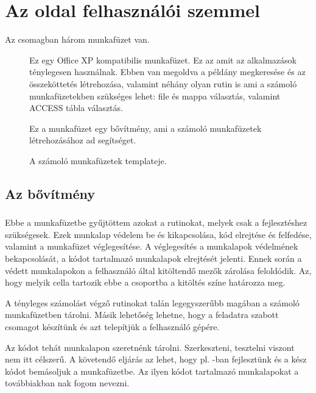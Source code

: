 \chapter{Az  oldal felhasználói szemmel}
\label{chap:3}

Az   csomagban három  munkafüzet van.
\begin{description}
\item[{}] Ez egy Office XP kompatibilis munkafüzet. Ez az
  amit az alkalmazások ténylegesen használnak. Ebben van megoldva a
   példány megkeresése és az összeköttetés létrehozása,
  valamint néhány olyan rutin is ami a számoló munkafüzetekben
  szükséges lehet: file és mappa választás, valamint ACCESS tábla választás.
\item[] Ez a munkafüzet egy bővítmény, ami a számoló
  munkafüzetek létrehozásához ad segítséget.
\item[] A számoló munkafüzetek templateje.
\end{description}

\section{Az  bővítmény}
\label{sec:3.1}

\subsection{}
Ebbe a munkafüzetbe gyűjtöttem azokat a rutinokat, melyek csak a
fejlesztéshez szükségesek. Ezek munkalap védelem be és kikapcsolása, 
kód elrejtése és felfedése, valamint a munkafüzet véglegesítése. A
véglegesítés a munkalapok védelmének bekapcsolását, a kódot tartalmazó
munkalapok elrejtését jelenti. Ennek során a védett munkalapokon a
felhasználó által kitöltendő mezők zárolása feloldódik. Az, hogy
melyik cella tartozik ebbe a csoportba a kitöltés színe határozza meg.

A tényleges számolást végző  rutinokat talán  legegyszerűbb magában
a számoló munkafüzetben tárolni. Másik lehetőség lehetne, hogy a
feladatra szabott  csomagot készítünk és azt telepítjük a felhasználó gépére.

Az  kódot tehát  munkalapon szeretnénk tárolni. Szerkeszteni,
tesztelni viszont 
nem itt célszerű. A követendő eljárás az lehet, hogy pl. -ban
fejlesztünk és a kész kódot bemásoljuk a munkafüzetbe. Az ilyen
 kódot tartalmazó munkalapokat a továbbiakban 
nak fogom nevezni.


